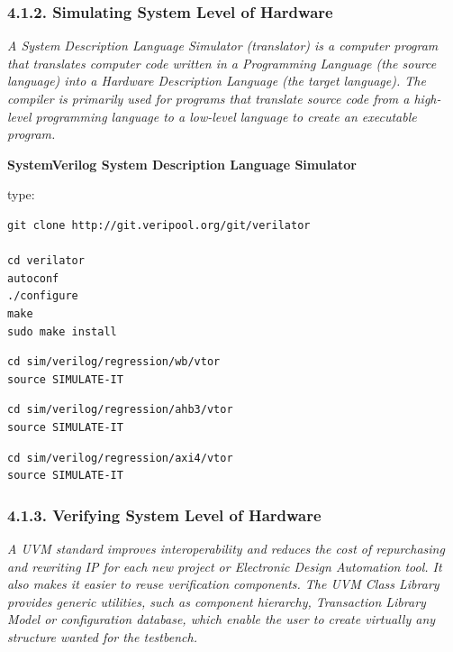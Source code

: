 \documentclass[
]{article}
\begin{document}
\hypertarget{simulating-system-level-of-hardware-1}{%
\subsubsection{4.1.2. Simulating System Level of
Hardware}\label{simulating-system-level-of-hardware-1}}

\emph{A System Description Language Simulator (translator) is a computer
program that translates computer code written in a Programming Language
(the source language) into a Hardware Description Language (the target
language). The compiler is primarily used for programs that translate
source code from a high-level programming language to a low-level
language to create an executable program.}

\textbf{SystemVerilog System Description Language Simulator}

type:

\begin{verbatim}
git clone http://git.veripool.org/git/verilator

cd verilator
autoconf
./configure
make
sudo make install
\end{verbatim}

\begin{verbatim}
cd sim/verilog/regression/wb/vtor
source SIMULATE-IT
\end{verbatim}

\begin{verbatim}
cd sim/verilog/regression/ahb3/vtor
source SIMULATE-IT
\end{verbatim}

\begin{verbatim}
cd sim/verilog/regression/axi4/vtor
source SIMULATE-IT
\end{verbatim}

\hypertarget{verifying-system-level-of-hardware-1}{%
\subsubsection{4.1.3. Verifying System Level of
Hardware}\label{verifying-system-level-of-hardware-1}}

\emph{A UVM standard improves interoperability and reduces the cost of
repurchasing and rewriting IP for each new project or Electronic Design
Automation tool. It also makes it easier to reuse verification
components. The UVM Class Library provides generic utilities, such as
component hierarchy, Transaction Library Model or configuration
database, which enable the user to create virtually any structure wanted
for the testbench.}
\end{document}
